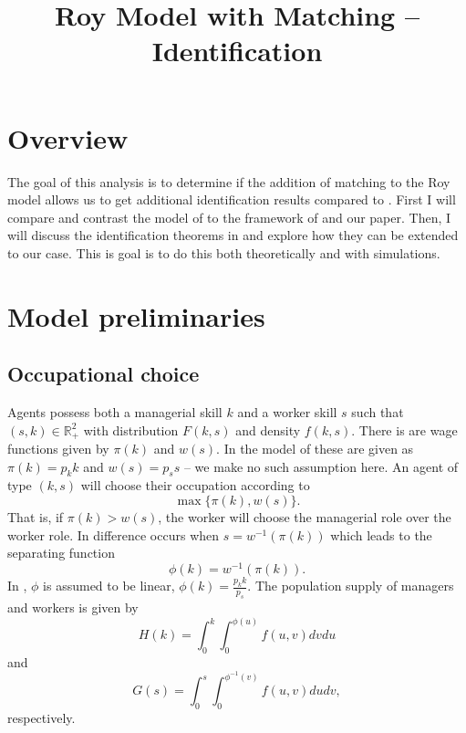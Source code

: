 \documentclass{article}
\title{Roy Model with Matching -- Identification}
\author{}
\date{}
\begin{document}
\maketitle
\vspace{-2cm}

\section{Overview}

The goal of this analysis is to determine if the addition of matching to the Roy model allows us to get additional identification results compared to \citet{heckman1990empirical}. First I will compare and contrast the model of \citet{heckman1990empirical} to the framework of \citet{mak2024occupational} and our paper. Then, I will discuss the identification theorems in \citet{heckman1990empirical} and explore how they can be extended to our case. This is goal is to do this both theoretically and with simulations.


\section{Model preliminaries}

\subsection{Occupational choice}


Agents possess both a managerial skill $k$ and a worker skill $s$ such that $(s,k) \in \mathbb{R}^2_+$ with distribution $F(k,s)$ and density $f(k,s)$. There is are wage functions given by $\pi(k)$ and $w(s)$. In the model of \citet{heckman1990empirical} these are given as $\pi(k) = p_k k$ and $w(s) = p_s s$ -- we make no such assumption here. An agent of type $(k,s)$ will choose their occupation according to 
\begin{equation*}
	\max\{\pi(k),w(s)\}.
\end{equation*}
That is, if $\pi(k) > w(s)$, the worker will choose the managerial role over the worker role. In difference occurs when $s=w^{-1}(\pi(k))$ which leads to the separating function
\begin{equation*}
	\phi(k) = w^{-1}(\pi(k)).
\end{equation*}
In \citet{heckman1990empirical}, $\phi$ is assumed to be linear, $\phi(k) = \frac{p_k k}{p_s} $. The population supply of managers and workers is given by
\begin{equation*}
	H(k) = \int_0^k\int_0^{\phi(u)} f(u,v) dv du
\end{equation*}
and
\begin{equation*}
	G(s) = \int_0^s\int_0^{\phi^{-1}(v)} f(u,v) du dv,
\end{equation*}
respectively. 
\end{document}
